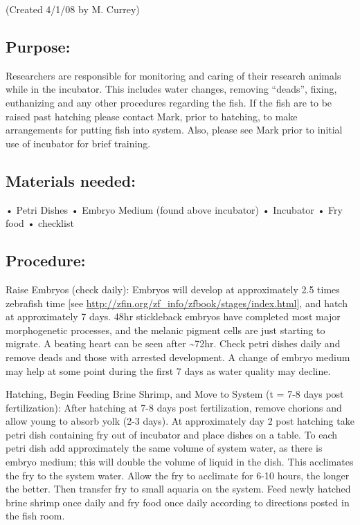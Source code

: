 \documentclass[
]{book}
\begin{document}
(Created 4/1/08 by M. Currey)

\hypertarget{purpose-1}{%
\subsection{Purpose:}\label{purpose-1}}

Researchers are responsible for monitoring and caring of their research animals while in the incubator. This includes water changes, removing ``deads'', fixing, euthanizing and any other procedures regarding the fish. If the fish are to be raised past hatching please contact Mark, prior to hatching, to make arrangements for putting fish into system. Also, please see Mark prior to initial use of incubator for brief training.

\hypertarget{materials-needed-1}{%
\subsection{Materials needed:}\label{materials-needed-1}}

• Petri Dishes
• Embryo Medium (found above incubator)
• Incubator
• Fry food
• checklist

\hypertarget{procedure-3}{%
\subsection{Procedure:}\label{procedure-3}}

Raise Embryos (check daily):
Embryos will develop at approximately 2.5 times zebrafish time {[}see \url{http://zfin.org/zf_info/zfbook/stages/index.html}{]}, and hatch at approximately 7 days. 48hr stickleback embryos have completed most major morphogenetic processes, and the melanic pigment cells are just starting to migrate. A beating heart can be seen after \textasciitilde72hr. Check petri dishes daily and remove deads and those with arrested development. A change of embryo medium may help at some point during the first 7 days as water quality may decline.

Hatching, Begin Feeding Brine Shrimp, and Move to System (t = 7-8 days post fertilization): After hatching at 7-8 days post fertilization, remove chorions and allow young to absorb yolk (2-3 days). At approximately day 2 post hatching take petri dish containing fry out of incubator and place dishes on a table. To each petri dish add approximately the same volume of system water, as there is embryo medium; this will double the volume of liquid in the dish. This acclimates the fry to the system water. Allow the fry to acclimate for 6-10 hours, the longer the better. Then transfer fry to small aquaria on the system. Feed newly hatched brine shrimp once daily and fry food once daily according to directions posted in the fish room.
\end{document}
